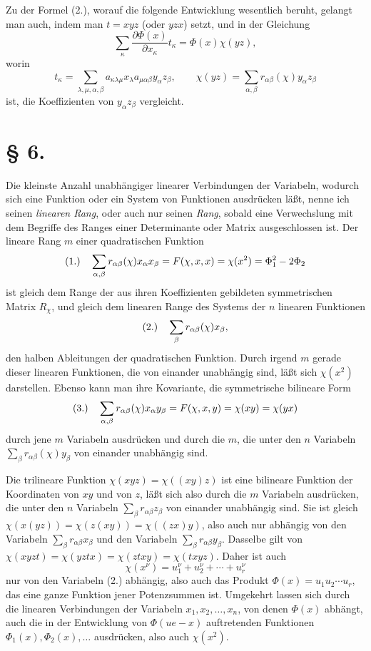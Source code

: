 \documentclass[11pt]{article}
\newcommand{\fnum}[1]{\textup{(\ensuremath{#1}.)}\quad}
\begin{document}
Zu der Formel (2.), worauf die folgende Entwicklung wesentlich beruht, gelangt man auch, indem man $t=xyz$ (oder $yzx$) setzt, und in der Gleichung
\[
 \sum_\kappa\frac{\partial\Phi(x)}{\partial x_\kappa}t_\kappa=\Phi(x)\chi(yz),
\]
worin
\[
 t_\kappa=\sum_{\lambda,\mu,\alpha,\beta}a_{\kappa\lambda\mu}x_\lambda a_{\mu\alpha\beta}y_\alpha z_\beta,\qquad
 \chi(yz)=\sum_{\alpha,\beta}r_{\alpha\beta}(\chi)y_\alpha z_\beta
\]
ist, die Koeffizienten von $y_\alpha z_\beta$ vergleicht.

\section*{§ 6.}

Die kleinste Anzahl unabhängiger linearer Verbindungen der Variabeln, wodurch sich eine Funktion oder ein System von Funktionen ausdrücken läßt, nenne ich seinen \emph{linearen Rang}, oder auch nur seinen \emph{Rang}, sobald eine Verwechslung mit dem Begriffe des Ranges einer Determinante oder Matrix ausgeschlossen ist. Der lineare Rang $m$ einer quadratischen Funktion
\[
\fnum{1} \sum_{\alpha,\beta}r_{\alpha\beta}(\chi)x_\alpha x_\beta
=F(\chi,x,x)=\chi(x^2)=\Phi_1^2-2\Phi_2
\]
ist gleich dem Range der aus ihren Koeffizienten gebildeten symmetrischen Matrix $R_\chi$, und gleich dem linearen Range des Systems der $n$ linearen Funktionen
\[
\fnum{2} \sum_\beta r_{\alpha\beta}(\chi)x_\beta,
\]
den halben Ableitungen der quadratischen Funktion. Durch irgend $m$ gerade dieser linearen Funktionen, die von einander unabhängig sind, läßt sich $\chi(x^2)$ darstellen. Ebenso kann man ihre Kovariante, die symmetrische bilineare Form
\[
\fnum{3} \sum_{\alpha,\beta}r_{\alpha\beta}(\chi)x_\alpha y_\beta
=F(\chi,x,y)=\chi(xy)=\chi(yx)
\]
durch jene $m$ Variabeln ausdrücken und durch die $m$, die unter den $n$ Variabeln $\sum_\beta r_{\alpha\beta}(\chi)y_\beta$ von einander unabhängig sind.

Die trilineare Funktion $\chi(xyz)=\chi((xy)z)$ ist eine bilineare Funktion der Koordinaten von $xy$ und von $z$, läßt sich also durch die $m$ Variabeln ausdrücken, die unter den $n$ Variabeln $\sum_\beta r_{\alpha\beta}z_\beta$ von einander unabhängig sind. Sie ist gleich $\chi(x(yz))=\chi(z(xy))=\chi((zx)y)$, also auch nur abhängig von den Variabeln $\sum_\beta r_{\alpha\beta}x_\beta$ und den Variabeln $\sum_\beta r_{\alpha\beta}y_\beta$. Dasselbe gilt von $\chi(xyzt)=\chi(yztx)=\chi(ztxy)=\chi(txyz)$. Daher ist auch
\[
 \chi(x^\nu)=u_1^\nu+u_2^\nu+\cdots+u_r^\nu
\]
nur von den Variabeln (2.) abhängig, also auch das Produkt $\Phi(x)=u_1u_2\cdots u_r$, das eine ganze Funktion jener Potenzsummen ist. Umgekehrt lassen sich durch die linearen Verbindungen der Variabeln $x_1,x_2,\ldots,x_n$, von denen $\Phi(x)$ abhängt, auch die in der Entwicklung von $\Phi(ue-x)$ auftretenden Funktionen $\Phi_1(x),\Phi_2(x),\ldots$ ausdrücken, also auch $\chi(x^2)$.
\end{document}
